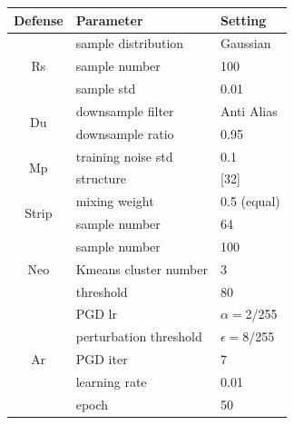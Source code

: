 \documentclass[compsoc,conference,a4paper,10pt,times]{IEEEtran}
\newcommand{\du}{{\sc Du}\xspace}
\newcommand{\strip}{{\sc Strip}\xspace}
\newcommand{\at}{{\sc Ar}\xspace}
\newcommand{\rands}{{\sc Rs}\xspace}
\newcommand{\neo}{{\sc Neo}\xspace}
\newcommand{\mmp}{{\sc Mp}\xspace}
\begin{document}
\begin{table}[!ht]{\footnotesize 
        \centering
        \renewcommand{\arraystretch}{1.2}
        \setlength{\tabcolsep}{2pt}
        \begin{tabular}{c|l|l}
            {Defense}                    & {Parameter}                              & {Setting}             \\
            \hline
            \hline

            \multirow{3}{*}{\rands}    & sample distribution                    & Gaussian            \\
                                      & sample number                          & 100                 \\
                                      & sample std                             & 0.01                \\
            \hline

            \multirow{2}{*}{\du}       & downsample filter                      & Anti Alias          \\
                                      & downsample ratio                       & 0.95                \\
            \hline

            \multirow{2}{*}{\mmp}      & training noise std                     & 0.1                 \\
                                      & structure                              & [32]                \\
            \hline

            \multirow{2}{*}{\strip}    & mixing weight                          & 0.5 (equal)         \\
                                      & sample number                          & 64                  \\
            \hline

            \multirow{3}{*}{\neo}      & sample number                          & 100                 \\
                                      & Kmeans cluster number                  & 3                   \\
                                      & threshold                              & 80                  \\
            \hline

            \multirow{5}{*}{\at}       & PGD lr                                 & $\alpha=$2/255      \\
                                      & perturbation threshold                 & $\epsilon=$8/255    \\
                                      & PGD iter                               & 7                   \\
                                      & learning rate                          & 0.01                \\
                                      & epoch                                  & 50                  \\
            \hline


\end{tabular}}
\end{table}
\end{document}

